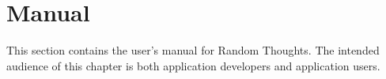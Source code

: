 
\chapter{Manual}
\label{chapt:manual}

This section contains the user's manual for Random Thoughts. The intended audience of this
chapter is both application developers and application users.

